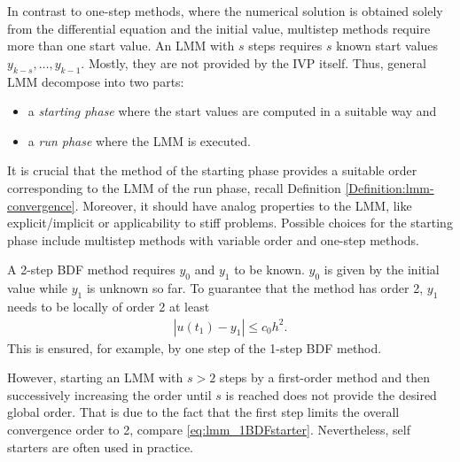 \begin{intro}
In contrast to one-step methods, where the numerical solution is obtained 
solely from the differential equation and the initial value, multistep 
methods require more than one start value. An LMM with $s$ steps requires $s$ 
known start values $y_{k-s}, \dots, y_{k-1}$. Mostly, they are not provided 
by the IVP itself. Thus, general LMM decompose into two parts: 
\begin{itemize}
\item a \emph{starting phase} where the start values are computed in a 
suitable way and
\item a \emph{run phase} where the LMM is executed. 
\end{itemize}
It is crucial that the method of the starting phase provides a suitable order 
corresponding to the LMM of the run phase, recall Definition 
\ref{Definition:lmm-convergence}. Moreover, it should have analog properties to 
the LMM, like explicit/implicit or applicability to stiff problems. 
Possible choices for the starting phase include multistep methods with variable 
order and one-step methods.  
\end{intro}

\begin{example}
A 2-step BDF method requires $y_0$ and $y_1$ to be known. $y_0$ is given by the 
initial value while $y_1$ is unknown so far. To guarantee that the method has 
order 2, $y_1$ needs to be locally of order 2 at least
\begin{align}\label{eq:lmm_1BDFstarter}
|u(t_1)-y_1| \leq c_0 h^2.
\end{align}
This is ensured, for example, by one step of the 1-step BDF method.

However, starting an LMM with $s>2$ steps by a first-order method and then 
successively increasing the order until $s$ is reached does not provide the 
desired global order. That is due to the fact that the first step limits  
the overall convergence order to 2, compare \eqref{eq:lmm_1BDFstarter}. 
Nevertheless, self starters are often used in practice. 
\end{example}


